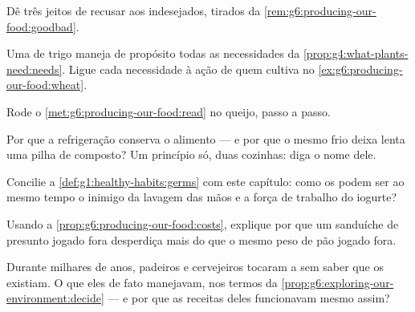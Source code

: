 \begin{exercise}[$\star$]\label{exo:g6:producing-our-food:6}
Dê três jeitos de recusar  aos  indesejados,
tirados da \cref{rem:g6:producing-our-food:goodbad}.
\end{exercise}

\begin{exercise}[$\star\star$]\label{exo:g6:producing-our-food:7}
Uma  de trigo maneja de propósito todas as necessidades da
\cref{prop:g4:what-plants-need:needs}. Ligue cada necessidade à ação
de quem cultiva no \cref{ex:g6:producing-our-food:wheat}.
\end{exercise}

\begin{exercise}[$\star\star$]\label{exo:g6:producing-our-food:8}
Rode o \cref{met:g6:producing-our-food:read} no queijo, passo a passo.
\end{exercise}

\begin{exercise}[$\star\star$]\label{exo:g6:producing-our-food:9}
Por que a refrigeração conserva o alimento --- e por que o mesmo frio
deixa lenta uma pilha de composto? Um princípio só, duas cozinhas:
diga o nome dele.
\end{exercise}

\begin{exercise}[$\star\star$]\label{exo:g6:producing-our-food:10}
Concilie a \cref{def:g1:healthy-habits:germs} com este capítulo: como
os  podem ser ao mesmo tempo o inimigo da lavagem das mãos e
a força de trabalho do iogurte?
\end{exercise}

\begin{exercise}[$\star\star$]\label{exo:g6:producing-our-food:11}
Usando a \cref{prop:g6:producing-our-food:costs}, explique por que um
sanduíche de presunto jogado fora desperdiça mais do que o mesmo peso
de pão jogado fora.
\end{exercise}

\begin{exercise}[$\star\star\star$]\label{exo:g6:producing-our-food:12}
Durante milhares de anos, padeiros e cervejeiros tocaram a 
sem saber que os  existiam. O que eles de fato manejavam, nos
termos da \cref{prop:g6:exploring-our-environment:decide} --- e por que
as receitas deles funcionavam mesmo assim?
\end{exercise}

